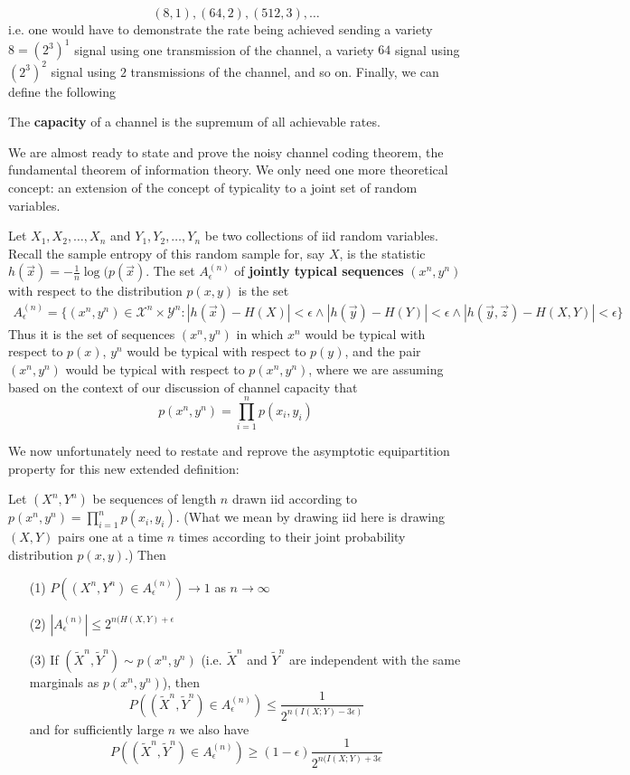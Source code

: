 \[ (8,1),(64,2),(512,3),\ldots \]
i.e. one would have to demonstrate the rate being achieved sending a variety $8 = (2^3)^1$ signal using one transmission of the channel, a variety $64$ signal using $(2^3)^2$ signal using $2$ transmissions of the channel, and so on. Finally, we can define the following 
\begin{definition}
	The \textbf{capacity} of a channel is the supremum of all achievable rates. 
\end{definition}
We are almost ready to state and prove the noisy channel coding theorem, the fundamental theorem of information theory. We only need one more theoretical concept: an extension of the concept of typicality to a joint set of random variables. 
\begin{definition}
	Let $X_1,X_2,\ldots,X_n$ and $Y_1,Y_2,\ldots,Y_n$ be two collections of iid random variables. Recall the sample entropy of this random sample for, say $X$, is the statistic $h(\vec{x}) = -\frac{1}{n}\log(p(\vec{x})$. The set $A_{\epsilon}^{(n)}$ of \textbf{jointly typical sequences} $(x^n,y^n)$ with respect to the distribution $p(x,y)$ is the set
	\begin{align}	
		A_{\epsilon}^{(n)} = \{(x^n,y^n) \in \mathcal{X}^n \times \mathcal{Y}^n: |h(\vec{x})-H(X)| < \epsilon \wedge |h(\vec{y})-H(Y)| < \epsilon \wedge |h(\vec{y},\vec{z})-H(X,Y)| < \epsilon \}
	\end{align}
	Thus it is the set of sequences $(x^n,y^n)$ in which $x^n$ would be typical with respect to $p(x)$, $y^n$ would be typical with respect to $p(y)$, and the pair $(x^n,y^n)$ would be typical with respect to $p(x^n,y^n)$, where we are assuming based on the context of our discussion of channel capacity that
	\[ p(x^n,y^n) = \prod_{i=1}^np(x_i,y_i) \]
\end{definition}
We now unfortunately need to restate and reprove the asymptotic equipartition property for this new extended definition:
\begin{theorem}
	Let $(X^n,Y^n)$ be sequences of length $n$ drawn iid according to $p(x^n,y^n) = \prod_{i=1}^np(x_i,y_i)$. (What we mean by drawing iid here is drawing $(X,Y)$ pairs one at a time $n$ times according to their joint probability distribution $p(x,y)$.) Then
	\begin{itemize}
		\item[(1)] $P((X^n,Y^n) \in A_{\epsilon}^{(n)}) \to 1$ as $n \to \infty$
		\item[(2)] $|A_{\epsilon}^{(n)}| \leq 2^{n(H(X,Y)+\epsilon}$
		\item[(3)] If $(\tilde{X}^n,\tilde{Y}^n)\sim p(x^n,y^n)$ (i.e. $\tilde{X}^n$ and $\tilde{Y}^n$ are independent with the same marginals as $p(x^n,y^n)$), then 
		\[ P\left( (\tilde{X}^n,\tilde{Y}^n) \in A_{\epsilon}^{(n)} \right) \leq \frac{1}{2^{n(I(X;Y)-3\epsilon)}} \]
		and for sufficiently large $n$ we also have
		\[ P\left( (\tilde{X}^n,\tilde{Y}^n) \in A_{\epsilon}^{(n)}\right) \geq (1-\epsilon)\frac{1}{2^{n(I(X;Y)+3\epsilon}} \]
	\end{itemize}
\end{theorem}
